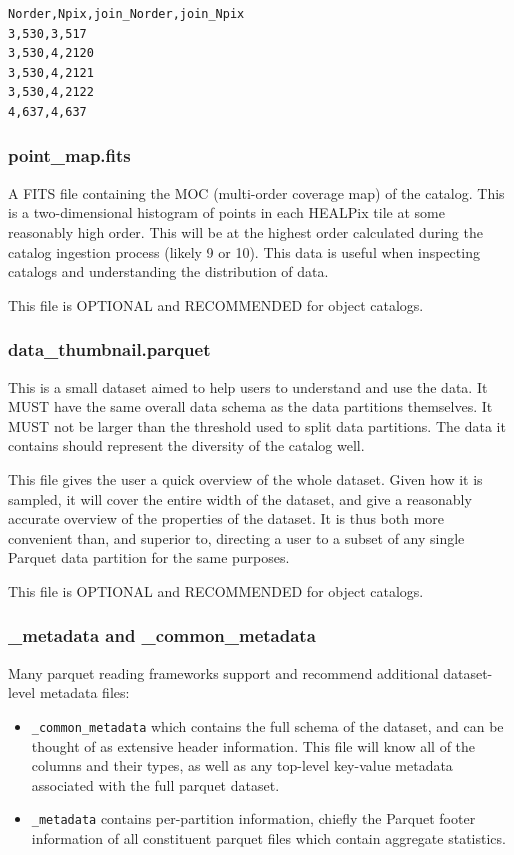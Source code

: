 \documentclass[11pt,a4paper]{ivoa}
\begin{document}
\begin{minipage}{\linewidth}
\begin{lstlisting}[caption=Example \texttt{partition\_join\_info.csv} file contents, label=fig:examplePartitionJoinInfoCsv]    
Norder,Npix,join_Norder,join_Npix
3,530,3,517
3,530,4,2120
3,530,4,2121
3,530,4,2122
4,637,4,637
\end{lstlisting}
\end{minipage}

\subsubsection{point\_map.fits} 

A FITS file containing the MOC (multi-order coverage map) of the catalog.
This is a two-dimensional histogram of points in each HEALPix tile at some reasonably high order.
This will be at the highest order calculated during the catalog ingestion process (likely 9 or 10). 
This data is useful when inspecting catalogs and understanding the distribution of data. 

This file is OPTIONAL and RECOMMENDED for object catalogs.

\subsubsection{data\_thumbnail.parquet} 
This is a small dataset aimed to help users to understand and use the data. 
It MUST have the same overall data schema as the data partitions themselves.
It MUST not be larger than the threshold used to split data partitions.
The data it contains should represent the diversity of the catalog well. \par

This file gives the user a quick overview of the whole dataset.
Given how it is sampled, it will cover the entire width of the dataset, and give a reasonably accurate overview of the properties of the dataset. 
It is thus both more convenient than, and superior to, directing a user to a subset of any single Parquet data partition for the same purposes.

This file is OPTIONAL and RECOMMENDED for object catalogs.

\subsubsection{\_metadata and \_common\_metadata} 

Many parquet reading frameworks support and recommend additional dataset-level metadata files:
\begin{itemize}
    \item \texttt{\_common\_metadata} which contains the full schema of the dataset, and can be thought of as extensive header information. 
    This file will know all of the columns and their types, as well as any top-level key-value metadata associated with the full parquet dataset.
    \item \texttt{\_metadata} contains per-partition information, chiefly the Parquet footer information of all constituent parquet files which contain aggregate statistics.
\end{itemize}
\end{document}
